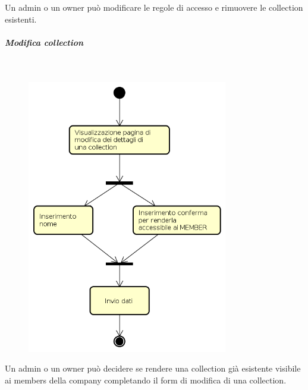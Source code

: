 Un admin o un owner può modificare le regole di accesso e rimuovere le collection esistenti.
\subparagraph{Modifica collection} \mbox{} \\
\begin{figure}[H]
\begin{center}
\includegraphics[height=12cm]{res/sections/backend/activities/modificaDatiCollection.png}
\end{center}
\end{figure}
Un admin o un owner può decidere se rendere una collection già esistente visibile ai members della company completando il form di modifica di una collection.
